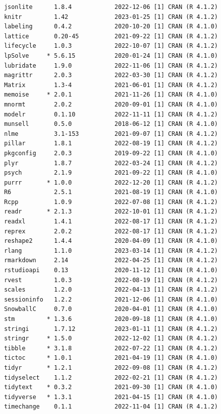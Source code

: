 \documentclass[
]{article}
\begin{document}
\begin{verbatim}
 jsonlite      1.8.4            2022-12-06 [1] CRAN (R 4.1.2)
 knitr         1.42             2023-01-25 [1] CRAN (R 4.1.2)
 labeling      0.4.2            2020-10-20 [1] CRAN (R 4.1.0)
 lattice       0.20-45          2021-09-22 [1] CRAN (R 4.1.2)
 lifecycle     1.0.3            2022-10-07 [1] CRAN (R 4.1.2)
 lpSolve     * 5.6.15           2020-01-24 [1] CRAN (R 4.1.0)
 lubridate     1.9.0            2022-11-06 [1] CRAN (R 4.1.2)
 magrittr      2.0.3            2022-03-30 [1] CRAN (R 4.1.2)
 Matrix        1.3-4            2021-06-01 [1] CRAN (R 4.1.2)
 memoise     * 2.0.1            2021-11-26 [1] CRAN (R 4.1.0)
 mnormt        2.0.2            2020-09-01 [1] CRAN (R 4.1.0)
 modelr        0.1.10           2022-11-11 [1] CRAN (R 4.1.2)
 munsell       0.5.0            2018-06-12 [1] CRAN (R 4.1.0)
 nlme          3.1-153          2021-09-07 [1] CRAN (R 4.1.2)
 pillar        1.8.1            2022-08-19 [1] CRAN (R 4.1.2)
 pkgconfig     2.0.3            2019-09-22 [1] CRAN (R 4.1.0)
 plyr          1.8.7            2022-03-24 [1] CRAN (R 4.1.2)
 psych         2.1.9            2021-09-22 [1] CRAN (R 4.1.0)
 purrr       * 1.0.0            2022-12-20 [1] CRAN (R 4.1.2)
 R6            2.5.1            2021-08-19 [1] CRAN (R 4.1.0)
 Rcpp          1.0.9            2022-07-08 [1] CRAN (R 4.1.2)
 readr       * 2.1.3            2022-10-01 [1] CRAN (R 4.1.2)
 readxl        1.4.1            2022-08-17 [1] CRAN (R 4.1.2)
 reprex        2.0.2            2022-08-17 [1] CRAN (R 4.1.2)
 reshape2      1.4.4            2020-04-09 [1] CRAN (R 4.1.0)
 rlang         1.1.0            2023-03-14 [1] CRAN (R 4.1.2)
 rmarkdown     2.14             2022-04-25 [1] CRAN (R 4.1.2)
 rstudioapi    0.13             2020-11-12 [1] CRAN (R 4.1.0)
 rvest         1.0.3            2022-08-19 [1] CRAN (R 4.1.2)
 scales        1.2.0            2022-04-13 [1] CRAN (R 4.1.2)
 sessioninfo   1.2.2            2021-12-06 [1] CRAN (R 4.1.0)
 SnowballC     0.7.0            2020-04-01 [1] CRAN (R 4.1.0)
 stm         * 1.3.6            2020-09-18 [1] CRAN (R 4.1.0)
 stringi       1.7.12           2023-01-11 [1] CRAN (R 4.1.2)
 stringr     * 1.5.0            2022-12-02 [1] CRAN (R 4.1.2)
 tibble      * 3.1.8            2022-07-22 [1] CRAN (R 4.1.2)
 tictoc      * 1.0.1            2021-04-19 [1] CRAN (R 4.1.0)
 tidyr       * 1.2.1            2022-09-08 [1] CRAN (R 4.1.2)
 tidyselect    1.1.2            2022-02-21 [1] CRAN (R 4.1.2)
 tidytext    * 0.3.2            2021-09-30 [1] CRAN (R 4.1.0)
 tidyverse   * 1.3.1            2021-04-15 [1] CRAN (R 4.1.0)
 timechange    0.1.1            2022-11-04 [1] CRAN (R 4.1.2)

\end{verbatim}
\end{document}
